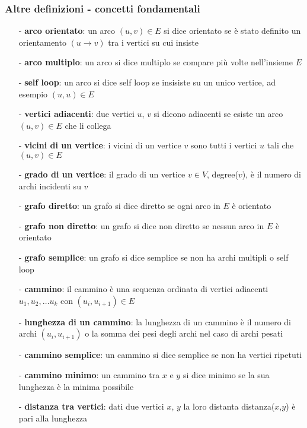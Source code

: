 \documentclass[a4paper]{article}
\begin{document}
\subsubsection*{Altre definizioni - concetti fondamentali}
\begin{itemize}[topsep=3pt, itemsep=0pt]
	\item[-] \textbf{arco orientato}: un arco \((u,v) \in E\) si dice orientato se è stato definito un orientamento \((u \to v)\)
	tra i vertici su cui insiste
	\item[-] \textbf{arco multiplo}: un arco si dice multiplo se compare più volte nell'insieme \(E\)
	\item[-] \textbf{self loop}: un arco si dice self loop se insisiste su un unico vertice, ad esempio \((u,u) \in E\)
	\item[-] \textbf{vertici adiacenti}: due vertici \(u\), \(v\) si dicono adiacenti se esiste un arco \((u,v) \in E\) che li collega
	\item[-] \textbf{vicini di un vertice}: i vicini di un vertice \(v\) sono tutti i vertici \(u\) tali che \((u,v) \in E\)
	\item[-] \textbf{grado di un vertice}: il grado di un vertice \(v \in V\), degree(\(v\)), è il numero di archi incidenti su \(v\)
	\item[-] \textbf{grafo diretto}: un grafo si dice diretto se ogni arco in \(E\) è orientato
	\item[-] \textbf{grafo non diretto}: un grafo si dice non diretto se nessun arco in \(E\) è orientato
	\item[-] \textbf{grafo semplice}: un grafo si dice semplice se non ha archi multipli o self loop
	\vspace{1em}
	\item[-] \textbf{cammino}: il cammino è una sequenza ordinata di vertici adiacenti \(u_1, u_2, \dots u_k\) con \((u_i, u_{i+1}) \in E\)
	\item[-] \textbf{lunghezza di un cammino}: la lunghezza di un cammino è il numero di archi \((u_i, u_{i+1})\) o la somma dei
	pesi degli archi nel caso di archi pesati
	\item[-] \textbf{cammino semplice}: un cammino si dice semplice se non ha vertici ripetuti
	\item[-] \textbf{cammino minimo}: un cammino tra \(x\) e \(y\) si dice minimo se la sua lunghezza è la minima possibile
	\item[-] \textbf{distanza tra vertici}: dati due vertici \(x\), \(y\) la loro distanta distanza(\(x\),\(y\)) è pari alla lunghezza

\end{itemize}
\end{document}
